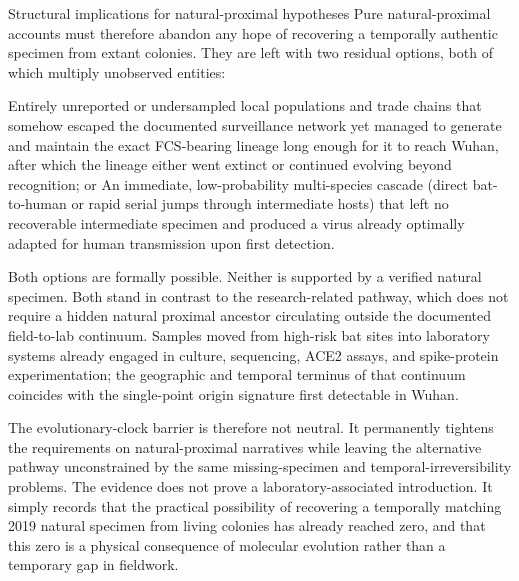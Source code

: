 Structural implications for natural-proximal hypotheses
Pure natural-proximal accounts must therefore abandon any hope of recovering a temporally authentic specimen from extant colonies. They are left with two residual options, both of which multiply unobserved entities:

Entirely unreported or undersampled local populations and trade chains that somehow escaped the documented surveillance network yet managed to generate and maintain the exact FCS-bearing lineage long enough for it to reach Wuhan, after which the lineage either went extinct or continued evolving beyond recognition; or  
An immediate, low-probability multi-species cascade (direct bat-to-human or rapid serial jumps through intermediate hosts) that left no recoverable intermediate specimen and produced a virus already optimally adapted for human transmission upon first detection.

Both options are formally possible. Neither is supported by a verified natural specimen. Both stand in contrast to the research-related pathway, which does not require a hidden natural proximal ancestor circulating outside the documented field-to-lab continuum. Samples moved from high-risk bat sites into laboratory systems already engaged in culture, sequencing, ACE2 assays, and spike-protein experimentation; the geographic and temporal terminus of that continuum coincides with the single-point origin signature first detectable in Wuhan.

The evolutionary-clock barrier is therefore not neutral. It permanently tightens the requirements on natural-proximal narratives while leaving the alternative pathway unconstrained by the same missing-specimen and temporal-irreversibility problems. The evidence does not prove a laboratory-associated introduction. It simply records that the practical possibility of recovering a temporally matching 2019 natural specimen from living colonies has already reached zero, and that this zero is a physical consequence of molecular evolution rather than a temporary gap in fieldwork.
